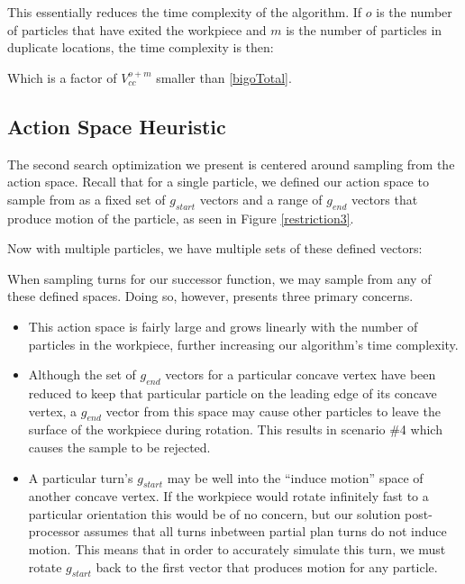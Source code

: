 This essentially reduces the time complexity of the algorithm. If $o$ is the number of particles that have exited the workpiece and $m$ is the number of particles in duplicate locations, the time complexity is then:

 {
  \label{eq:bigoTotalWithHeuristic}
}

Which is a factor of $V_{cc}^{o + m}$ smaller than \eqref{bigoTotal}.

\subsection{Action Space Heuristic}

The second search optimization we present is centered around sampling from the action space. Recall that for a single particle, we defined our action space to sample from as a fixed set of $g_{start}$ vectors and a range of $g_{end}$ vectors that produce motion of the particle, as seen in Figure \ref{restriction3}.

Now with multiple particles, we have multiple sets of these defined vectors:


When sampling turns for our successor function, we may sample from any of these defined spaces. Doing so, however, presents three primary concerns.

\begin{itemize}
\item This action space is fairly large and grows linearly with the number of particles in the workpiece, further increasing our algorithm's time complexity.
\item Although the set of $g_{end}$ vectors for a particular concave vertex have been reduced to keep that particular particle on the leading edge of its concave vertex, a $g_{end}$ vector from this space may cause other particles to leave the surface of the workpiece during rotation. This results in scenario \#4 which causes the sample to be rejected.
\item A particular turn's $g_{start}$ may be well into the ``induce motion'' space of another concave vertex. If the workpiece would rotate infinitely fast to a particular orientation this would be of no concern, but our solution post-processor assumes that all turns inbetween partial plan turns do not induce motion. This means that in order to accurately simulate this turn, we must rotate $g_{start}$ back to the first vector that produces motion for any particle.
\end{itemize}

